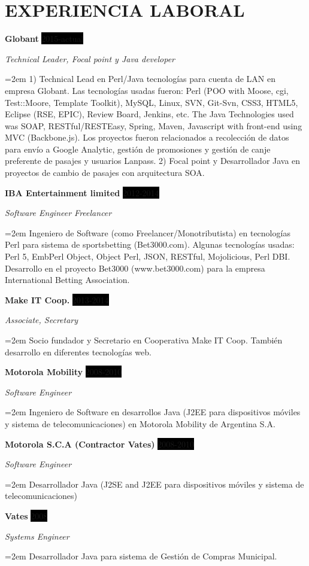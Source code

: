 \documentclass[paper=a4,fontsize=11pt]{scrartcl} %
\newcommand{\sepspace}{\vspace*{1em}}		%
\newcommand{\NewPart}[1]{\section*{\uppercase{#1}}}
\newcommand{\EducationEntry}[4]{
		\noindent \textbf{#1} \hfill      %
		\colorbox{Black}{%
			\parbox{6em}{%
			\hfill\color{White}#2}} \par  %
		\noindent \textit{#3} \par        %
		\noindent\hangindent=2em\hangafter=0 \small #4 %
		\normalsize \par}
\newcommand{\WorkEntry}[4]{				  %
		\noindent \textbf{#1} \hfill      %
		\colorbox{Black}{\color{White}#2} \par  %
		\noindent \textit{#3} \par              %
		\noindent\hangindent=2em\hangafter=0 \small #4 %
		\normalsize \par}
\begin{document}
\NewPart{Experiencia laboral}{}

\WorkEntry{Globant}{2015-actual}{Technical Leader, Focal point y Java developer}
{1) Technical Lead en Perl/Java tecnologías para cuenta de LAN en empresa Globant. Las tecnologías usadas fueron: Perl (POO with Moose, cgi, Test::Moore, Template Toolkit), MySQL, Linux, SVN, Git-Svn, CSS3, HTML5, Eclipse (RSE, EPIC), Review Board, Jenkins, etc. The Java Technologies used was SOAP, RESTful/RESTEasy, Spring, Maven, Javascript with front-end using MVC (Backbone.js). Los proyectos fueron  relacionados a recolección de datos para envío a Google Analytic, gestión de promosiones y gestión de canje preferente de pasajes y usuarios Lanpass.
2) Focal point y Desarrollador Java en proyectos de cambio de pasajes con arquitectura SOA.}

\sepspace

\WorkEntry{IBA Entertainment limited}{2012-2014}{Software Engineer Freelancer}
{Ingeniero de Software (como Freelancer/Monotributista) en tecnologías Perl para sistema de sportsbetting (Bet3000.com). Algunas tecnologías usadas: Perl 5, EmbPerl Object, Object Perl, JSON, RESTful, Mojolicious, Perl DBI. Desarrollo en el proyecto Bet3000 (www.bet3000.com) para la empresa International Betting Association.}

\sepspace

\WorkEntry{Make IT Coop.}{2013-2014}{Associate, Secretary}{
Socio fundador y Secretario en Cooperativa Make IT Coop. También desarrollo en diferentes tecnologías web.}

\sepspace

\WorkEntry{Motorola Mobility}{2008-2010}{Software Engineer}
{Ingeniero de Software en desarrollos Java (J2EE para dispositivos móviles y sistema de telecomunicaciones) en Motorola Mobility de Argentina S.A.}

\sepspace

\WorkEntry{Motorola S.C.A (Contractor Vates)}{2008-2010}{Software Engineer}
{Desarrollador Java (J2SE and J2EE para dispositivos móviles y sistema de telecomunicaciones)}

\sepspace

\WorkEntry{Vates}{2008}{Systems Engineer}
{Desarrollador Java para sistema de Gestión de Compras Municipal.}
\end{document}

